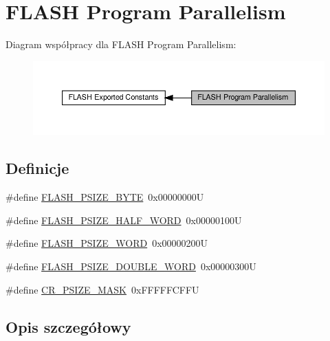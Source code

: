 \hypertarget{group___f_l_a_s_h___program___parallelism}{}\section{F\+L\+A\+SH Program Parallelism}
\label{group___f_l_a_s_h___program___parallelism}
Diagram współpracy dla F\+L\+A\+SH Program Parallelism\+:\nopagebreak
\begin{figure}[H]
\begin{center}
\leavevmode
\includegraphics[width=350pt]{group___f_l_a_s_h___program___parallelism}
\end{center}
\end{figure}
\subsection*{Definicje}
\begin{DoxyCompactItemize}
\item 
\#define \hyperlink{group___f_l_a_s_h___program___parallelism_ga83c67710aa697216193654e1e90cc953}{F\+L\+A\+S\+H\+\_\+\+P\+S\+I\+Z\+E\+\_\+\+B\+Y\+TE}~0x00000000U
\item 
\#define \hyperlink{group___f_l_a_s_h___program___parallelism_gad3210ba7423b45cb3063f4294cdeab16}{F\+L\+A\+S\+H\+\_\+\+P\+S\+I\+Z\+E\+\_\+\+H\+A\+L\+F\+\_\+\+W\+O\+RD}~0x00000100U
\item 
\#define \hyperlink{group___f_l_a_s_h___program___parallelism_gac3ac337ed43efc869a9f734527e44673}{F\+L\+A\+S\+H\+\_\+\+P\+S\+I\+Z\+E\+\_\+\+W\+O\+RD}~0x00000200U
\item 
\#define \hyperlink{group___f_l_a_s_h___program___parallelism_ga0fd17c4e281f199f09a6a6365e9243ee}{F\+L\+A\+S\+H\+\_\+\+P\+S\+I\+Z\+E\+\_\+\+D\+O\+U\+B\+L\+E\+\_\+\+W\+O\+RD}~0x00000300U
\item 
\#define \hyperlink{group___f_l_a_s_h___program___parallelism_ga7c755f15e36221021a1438857e40365c}{C\+R\+\_\+\+P\+S\+I\+Z\+E\+\_\+\+M\+A\+SK}~0x\+F\+F\+F\+F\+F\+C\+F\+FU
\end{DoxyCompactItemize}


\subsection{Opis szczegółowy}


